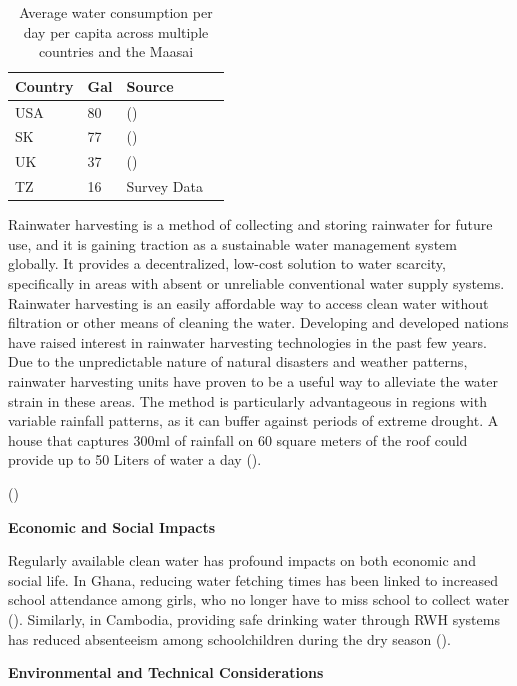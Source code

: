 \documentclass[10pt, twocolumn]{article}
\begin{document}
\begin{table} [H]
    \begin{tabular}{@{}llll@{}}
    \toprule
    Country & \multicolumn{1}{l}{Gal} & Source &  \\ \midrule
    USA & 80 & (\autocite{USA_Water}) &  \\
    SK & 77 & (\autocite{SK_Water}) &  \\
    UK & 37 & (\autocite{UK_Water}) &  \\
    TZ & 16& Survey Data & \\ \bottomrule
    \end{tabular}
    \caption{Average water consumption per day per capita across multiple countries and the Maasai}
    \label{tab:water_consumption}
\end{table}

Rainwater harvesting is a method of collecting and storing rainwater for future use, and it is gaining traction as a sustainable water management system globally. It provides a decentralized, low-cost solution to water scarcity, specifically in areas with absent or unreliable conventional water supply systems. Rainwater harvesting is an easily affordable way to access clean water without filtration or other means of cleaning the water. Developing and developed nations have raised interest in rainwater harvesting technologies in the past few years. Due to the unpredictable nature of natural disasters and weather patterns, rainwater harvesting units have proven to be a useful way to alleviate the water strain in these areas. The method is particularly advantageous in regions with variable rainfall patterns, as it can buffer against periods of extreme drought. A house that captures 300ml of rainfall on 60 square meters of the roof could provide up to 50 Liters of water a day (\autocite{amos2018economic}).

(\autocite{kim2016community})

\textbf{Economic and Social Impacts}

Regularly available clean water has profound impacts on both economic and social life. In Ghana, reducing water fetching times has been linked to increased school attendance among girls, who no longer have to miss school to collect water (\autocite{Nauges2017}). Similarly, in Cambodia, providing safe drinking water through RWH systems has reduced absenteeism among schoolchildren during the dry season (\autocite{Cambodia_Water_Education}).

\textbf{Environmental and Technical Considerations}
\end{document}
